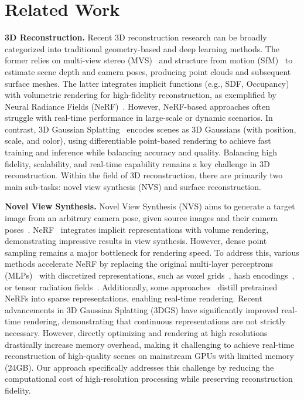 \section{Related Work}

\noindent\textbf{3D Reconstruction.} 
Recent 3D reconstruction research can be broadly categorized into traditional geometry-based and deep learning methods. The former relies on multi-view stereo (MVS)~\cite{YAN} and structure from motion (SfM)~\cite{sfm} to estimate scene depth and camera poses, producing point clouds and subsequent surface meshes. The latter integrates implicit functions (e.g., SDF, Occupancy)~\cite{Tri} with volumetric rendering for high-fidelity reconstruction, as exemplified by Neural Radiance Fields (NeRF)~\cite{nerf}. However, NeRF-based approaches often struggle with real-time performance in large-scale or dynamic scenarios. In contrast, 3D Gaussian Splatting~\cite{3dgs} encodes scenes as 3D Gaussians (with position, scale, and color), using differentiable point-based rendering to achieve fast training and inference while balancing accuracy and quality. Balancing high fidelity, scalability, and real-time capability remains a key challenge in 3D reconstruction.
Within the field of 3D reconstruction, there are primarily two main sub-tasks: novel view synthesis (NVS) and surface reconstruction. 

\vspace{0.5em}

\noindent\textbf{Novel View Synthesis.} 
Novel View Synthesis (NVS) aims to generate a target image from an arbitrary camera pose, given source images and their camera poses~\cite{light, lum}. NeRF~\cite{nerf} integrates implicit representations with volume rendering\cite{volume, eff}, demonstrating impressive results in view synthesis. However, dense point sampling remains a major bottleneck for rendering speed. To address this, various methods accelerate NeRF by replacing the original multi-layer perceptrons (MLPs)~\cite{learining, deep} with discretized representations, such as voxel grids~\cite{dir}, hash encodings~\cite{Instant}, or tensor radiation fields~\cite{tensorf}. Additionally, some approaches~\cite{bake, merf} distill pretrained NeRFs into sparse representations, enabling real-time rendering. Recent advancements in 3D Gaussian Splatting (3DGS) have significantly improved real-time rendering, demonstrating that continuous representations are not strictly necessary. However, directly optimizing and rendering at high resolutions drastically increase memory overhead, making it challenging to achieve real-time reconstruction of high-quality scenes on mainstream GPUs with limited memory (24GB). Our approach specifically addresses this challenge by reducing the computational cost of high-resolution processing while preserving reconstruction fidelity. 

